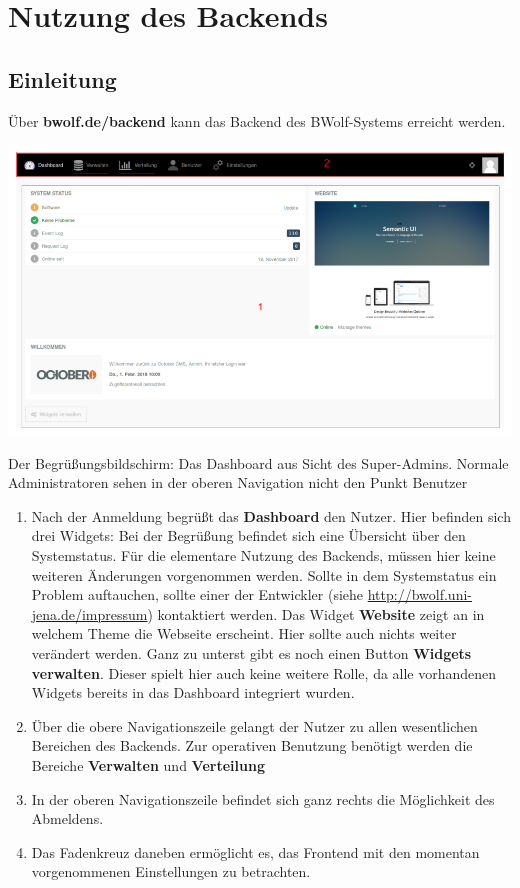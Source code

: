 \chapter{Nutzung des Backends}
\label{chapter:use}
  
  \section{Einleitung}
  \label{section:backend_introduction}
  
  Über \textbf{bwolf.de/backend} kann das Backend des BWolf-Systems erreicht werden.
  
  \includegraphics[scale=0.3]{backend/img/dashboard.png}
  \caption{\newline Der Begrüßungsbildschirm: Das Dashboard aus Sicht des Super-Admins.\newline
	  Normale Administratoren sehen in der oberen Navigation nicht den Punkt Benutzer}
  \begin{enumerate}
   \item Nach der Anmeldung begrüßt das \textbf{Dashboard} den Nutzer. 
	  Hier befinden sich drei Widgets:\newline
	  Bei der Begrüßung befindet sich eine Übersicht über den Systemstatus.\newline
	  Für die elementare Nutzung des Backends, müssen hier keine weiteren Änderungen vorgenommen werden.\newline
	  Sollte in dem Systemstatus ein Problem auftauchen, sollte einer der Entwickler (siehe \url{http://bwolf.uni-jena.de/impressum}) 
	  kontaktiert werden.\newline
	  Das Widget \textbf{Website} zeigt an in welchem Theme die Webseite erscheint. Hier sollte auch nichts weiter verändert werden.
	  Ganz zu unterst gibt es noch einen Button \textbf{Widgets verwalten}. 
	  Dieser spielt hier auch keine weitere Rolle, da alle vorhandenen Widgets bereits in das Dashboard integriert wurden.
   \item Über die obere Navigationszeile gelangt der Nutzer zu allen wesentlichen Bereichen des Backends.
	 Zur operativen Benutzung benötigt werden die Bereiche \textbf{Verwalten} und \textbf{Verteilung}
   \item[] In der oberen Navigationszeile befindet sich ganz rechts die Möglichkeit des Abmeldens.
   \item[] Das Fadenkreuz daneben ermöglicht es, das Frontend mit den momentan vorgenommenen Einstellungen zu betrachten.
  \end{enumerate}

